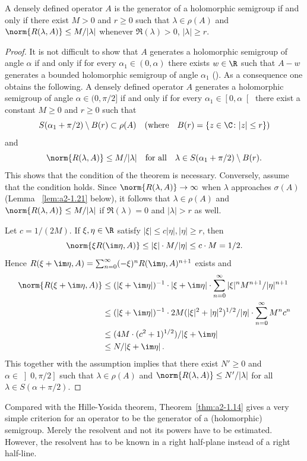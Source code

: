 \begin{theorem}\label{thm:a2-1.14}
A densely defined operator $A$ is the generator of a holomorphic semigroup if and only if there exist $M > 0$ and $r \geq 0$ such that $\lambda \in \rho(A)$ and $\norm{R(\lambda,A)} \leq M/|\lambda|$ whenever $\Re(\lambda) > 0$, $|\lambda| \geq r$.
\end{theorem}
\begin{proof}
It is not difficult to show that $A$ generates a holomorphic semigroup of angle $\alpha$ if and only if for every $\alpha_{1} \in (0,\alpha)$ there exists 
$w \in \R$ such that $A - w$ generates a bounded holomorphic semigroup of angle 
$\alpha_{1}$ (\cf \textcite[p.252]{reedsimon:1978}).
As a consequence one obtains the following.
A densely defined operator $A$ generates a holomorphic semigroup of angle $\alpha \in (0,\pi/2]$ if and only if for every $\alpha_{1} \in \left[0,\alpha\right[$ there exist a constant $M \geq 0$ and $r \geq 0$ such that 
\[
S(\alpha_{1} + \pi/2) \setminus B(r) \subset \rho(A) \quad (\text{where} \quad B(r) = \{z \in \C \colon |z| \leq r\})
\]
and
\[
\norm{R(\lambda,A)} \leq M/|\lambda|  \quad \text{for all}  \quad \lambda \in S(\alpha_{1}+\pi/2) \setminus B(r).
\]
This shows that the condition of the theorem is necessary.
Conversely, assume that the condition holds.
Since $\norm{R(\lambda,A)} \to \infty$ when $\lambda$ approaches $\sigma(A)$ (\cf Lemma ~\ref{lem:a2-1.21}   below), 
it follows that $\lambda \in \rho(A)$ and $\norm{R(\lambda,A)} \leq M/|\lambda|$ if\/ $\Re(\lambda) = 0$ and $|\lambda| > r$ as well.

Let $c = 1/(2M)$.
If\/ $\xi, \eta \in \R$ satisfy 
$|\xi| \leq c|\eta|, |\eta| \geq r$, 
then 
\[
\norm{\xi R(\im\eta,A)} \leq |\xi| \cdot M/|\eta| \leq c \cdot M = 1/2.
\]
Hence $R(\xi+\im\eta,A) = \sum_{n=0}^\infty (-\xi)^{n}R(\im\eta,A)^{n+1}$ exists and 
\begin{align*}
    \norm{R(\xi+\im\eta,A)} &\leq 
    (|\xi + \im\eta|)^{-1} \cdot |\xi + \im\eta| \cdot \sum_{n=0}^\infty |\xi|^{n}M^{n+1}/|\eta|^{n+1}\\
    &\leq  (|\xi + \im\eta|)^{-1} \cdot 2M (|\xi|^{2} + |\eta|^{2})^{1/2} / |\eta| \cdot \sum_{n=0}^\infty M^{n}c^{n}\\   
    &\leq  (4M\cdot(c^{2}+1)^{1/2})/|\xi+\im\eta| \\
    &\leq N/|\xi+\im\eta| \, . 
\end{align*}
This together with the assumption implies that there exist $N' \geq 0$ and $\alpha \in \left]0,\pi/2\right]$ such that $\lambda \in \rho(A)$ and $\norm{R(\lambda,A)} \leq N'/|\lambda|$ for all $\lambda \in S(\alpha+\pi/2)$.
\end{proof}
Compared with the Hille-Yosida theorem, Theorem~\ref{thm:a2-1.14}   gives a very simple criterion for an operator to be the generator of a (holomorphic) semigroup.
Merely the resolvent and not its powers have to be
estimated.
However, the resolvent has to be known in a right half-plane instead of a right half-line.


